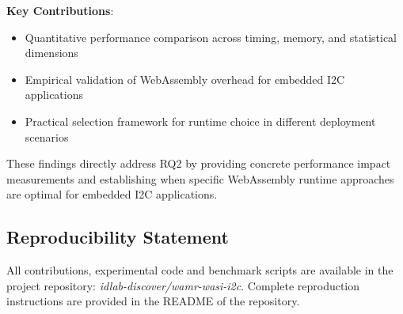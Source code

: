 \textbf{Key Contributions}:
\begin{itemize}
    \item Quantitative performance comparison across timing, memory, and statistical dimensions
    \item Empirical validation of WebAssembly overhead for embedded I2C applications
    \item Practical selection framework for runtime choice in different deployment scenarios
\end{itemize}

These findings directly address RQ2 by providing concrete performance impact measurements and establishing when specific WebAssembly runtime approaches are optimal for embedded I2C applications.

\subsection{Reproducibility Statement}
\label{subsec:eval-conclusion-reproducibility}

All contributions, experimental code and benchmark scripts are available in the project repository: \textit{idlab-discover/wamr-wasi-i2c}. Complete reproduction instructions are provided in the README of the repository.
